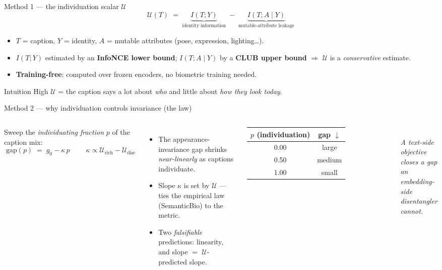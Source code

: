 \documentclass[aspectratio=169,10pt]{beamer}
\newcommand{\U}{\mathcal{U}}
\begin{document}
\begin{frame}{Method 1 --- the individuation scalar $\U$}
  \[
    \U(T) \;=\; \underbrace{I(T;Y)}_{\text{identity information}}
              \;-\; \underbrace{I(T;A \mid Y)}_{\text{mutable-attribute leakage}}
  \]
  \begin{itemize}
    \item $T$ = caption, $Y$ = identity, $A$ = mutable attributes (pose, expression, lighting\ldots).
    \item $I(T;Y)$ estimated by an \textbf{InfoNCE lower bound}; $I(T;A\mid Y)$ by a
      \textbf{CLUB upper bound} $\Rightarrow$ $\U$ is a \emph{conservative} estimate.
    \item \textbf{Training-free}: computed over frozen encoders, no biometric training needed.
  \end{itemize}
  \vspace{0.5em}
  \begin{exampleblock}{Intuition}
    High $\U$ = the caption says a lot about \emph{who} and little about \emph{how they look today}.
  \end{exampleblock}
\end{frame}

\begin{frame}{Method 2 --- why individuation controls invariance (the law)}
  \begin{columns}[T]
      Sweep the \emph{individuating fraction} $p$ of the caption mix:
      \[
        \boxed{\;\text{gap}(p) \;=\; g_0 - \kappa\, p\;}
        \qquad \kappa \propto \U_{\text{rich}} - \U_{\text{disc}}
      \]
      \begin{itemize}
        \item The appearance-invariance gap shrinks \emph{near-linearly} as captions individuate.
        \item Slope $\kappa$ is set by $\U$ --- ties the empirical law (SemanticBio) to the metric.
        \item Two \emph{falsifiable} predictions: linearity, and slope $=$ $\U$-predicted slope.
      \end{itemize}
      \centering
      \footnotesize
      \begin{tabular}{cc}
        \toprule
        $p$ (individuation) & gap $\downarrow$ \\
        \midrule
        0.00 & large \\
        0.50 & medium \\
        1.00 & small \\
        \bottomrule
      \end{tabular}
      \\[0.5em]
      \emph{A text-side objective closes a gap an\\ embedding-side disentangler cannot.}
  \end{columns}
\end{frame}
\end{document}
